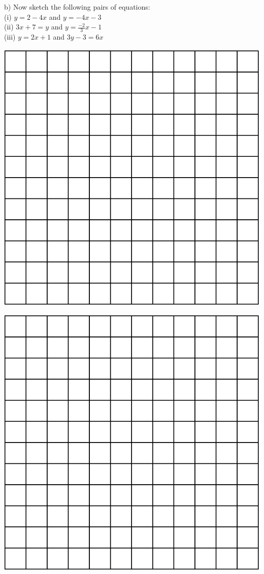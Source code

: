 \documentclass{article}
\begin{document}
\begin{flushleft}
\newpage
b) Now sketch the following pairs of equations:\\
(i) $y=2-4x$ and $y=-4x-3$\\
(ii) $3x+7=y$ and $y=\frac{-2}{3}x-1$\\
(iii) $y=2x+1$ and $3y-3=6x$

\vspace{0.25in}

\begin{minipage}{3in}
\includegraphics[scale=0.75]{grid_12_by_12.eps}
\end{minipage}
\begin{minipage}{3in}
\includegraphics[scale=0.75]{grid_12_by_12.eps}

\end{minipage}
\end{flushleft}
\end{document}
